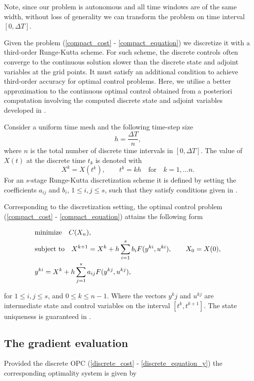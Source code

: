 \documentclass[a4paper,10pt, english]{article}
\newcommand{\D}{\displaystyle}
\begin{document}
  Note, since our problem is autonomous and all time windows are of the same width, without loss of generality
 we can transform the problem on time interval $[0, \Delta T]$. 
 
 
  
  Given the problem (\ref{compact_cost} - \ref{compact_equation}) we discretize it with a third-order Runge-Kutta scheme.  For such scheme, the discrete controls often converge to the continuous solution slower than the discrete state and adjoint variables at the grid points. It  must satisfy an additional condition to achieve third-order accuracy
    for optimal control problems. Here, we utilise a better approximation to the continuous optimal control obtained from a posteriori computation involving the computed discrete state and adjoint variables  developed in \cite{Hager2000}. 
    
  Consider a uniform time mesh and the following time-step size
 \begin{equation}
   h = \frac{\Delta T}{n},
   \label{h}
 \end{equation}
 where $n$ is the total number of discrete time intervals in $[0, \Delta T]$.  The value of $X(t)$ at the discrete time $t_k$ is denoted with
 $$
 X^k = X(t^k), \qquad t^k = kh \quad\mbox{for} \quad k = 1, \dots n.
 $$
 For an $s$-stage Runge-Kutta discretization scheme it is defined by setting the coefficients $a_{ij}$ and
 $b_{i}$, $1\leq i, j\leq s$, such that they satisfy conditions given in \cite{Hager2000}. 
 
 Corresponding to the discretization setting, the optimal control problem (\ref{compact_cost} -  \ref{compact_equation})  attains the following form
 
 \begin{align}
  \D
  & \mbox{minimize}\quad C(X_n), \label{discrete_cost}\\
  & \mbox{subject to} \quad X^{k+1}  = X^k + h\sum_{i=1}^{s}b_iF(y^{ki}, u^{ki}), \qquad X_0 = X(0), \label{discrete_equation_x}\\
  & y^{ki} = X^k + h\sum_{j=1}^{s}a_{ij}F(y^{kj}, u^{kj}),\label{discrete_equation_y}
  \end{align}
 
 for $1\leq i, j\leq s$, and $0\leq k\leq n-1$.
 Where the vectors $y^kj$ and $u^{kj}$ are intermediate state and control variables on the interval $[t^k, t^{k+1}]$. The state uniqueness is guaranteed in \cite{Hager2000}. 
 
 
 

\newpage
\subsection{The gradient evaluation}
Provided the discrete OPC (\ref{discrete_cost} - \ref{discrete_equation_y}) the corresponding  optimality system  is given by
\end{document}
